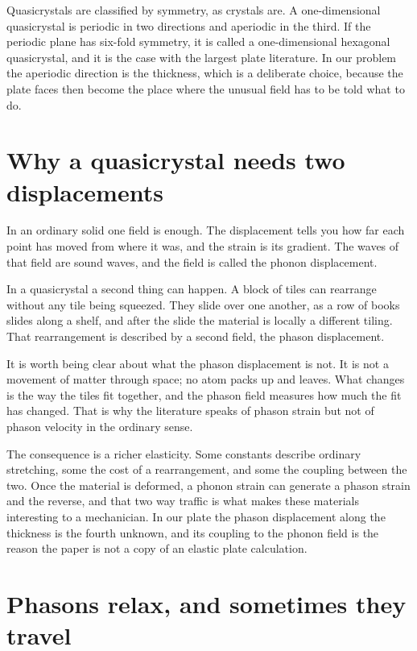 \documentclass[11pt]{article}
\begin{document}
Quasicrystals are classified by symmetry, as crystals are. A one-dimensional quasicrystal is periodic in two
directions and aperiodic in the third. If the periodic plane has six-fold symmetry, it is called a
one-dimensional hexagonal quasicrystal, and it is the case with the largest plate literature. In our problem
the aperiodic direction is the thickness, which is a deliberate choice, because the plate faces then become
the place where the unusual field has to be told what to do.

\section{Why a quasicrystal needs two displacements}

In an ordinary solid one field is enough. The displacement tells you how far each point has moved from where
it was, and the strain is its gradient. The waves of that field are sound waves, and the field is called the
phonon displacement.

In a quasicrystal a second thing can happen. A block of tiles can rearrange without any tile being squeezed.
They slide over one another, as a row of books slides along a shelf, and after the slide the material is
locally a different tiling. That rearrangement is described by a second field, the phason displacement.

It is worth being clear about what the phason displacement is not. It is not a movement of matter through
space; no atom packs up and leaves. What changes is the way the tiles fit together, and the phason field
measures how much the fit has changed. That is why the literature speaks of phason strain but not of phason
velocity in the ordinary sense.

The consequence is a richer elasticity. Some constants describe ordinary stretching, some the cost of a
rearrangement, and some the coupling between the two. Once the material is deformed, a phonon strain can
generate a phason strain and the reverse, and that two way traffic is what makes these materials interesting
to a mechanician. In our plate the phason displacement along the thickness is the fourth unknown, and its
coupling to the phonon field is the reason the paper is not a copy of an elastic plate calculation.

\section{Phasons relax, and sometimes they travel}
\end{document}
